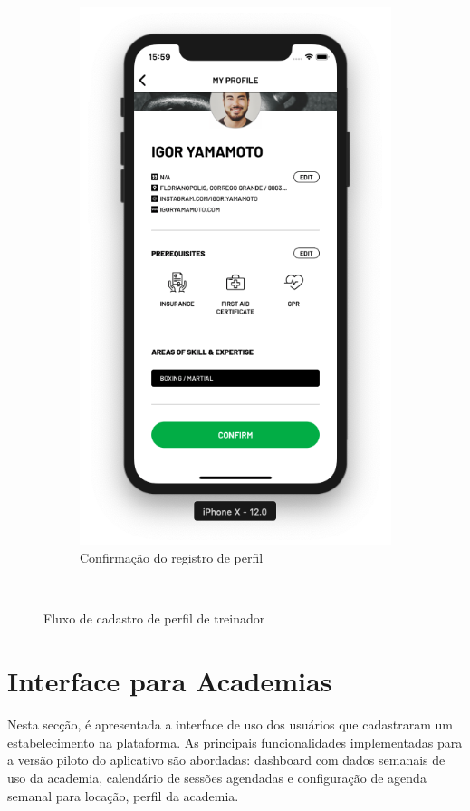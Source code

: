 \begin{figure}[H]
\begin{subfigure}[b]{0.3\textwidth}
        \includegraphics[width=\textwidth]{pfc/figuras/tr-register-profile-3.png}
        \caption{Confirmação do registro de perfil}
        \label{fig:register-tr-profile-confirmation}
    \end{subfigure}
    ~
    \caption{Fluxo de cadastro de perfil de treinador}
    \label{fig:register-tr-profile}
\end{figure}

\section{Interface para Academias}
Nesta secção, é apresentada a interface de uso dos usuários que cadastraram um estabelecimento na plataforma. As principais funcionalidades implementadas para a versão piloto do aplicativo são abordadas: dashboard com dados semanais de uso da academia, calendário de sessões agendadas e configuração de agenda semanal para locação, perfil da academia.

